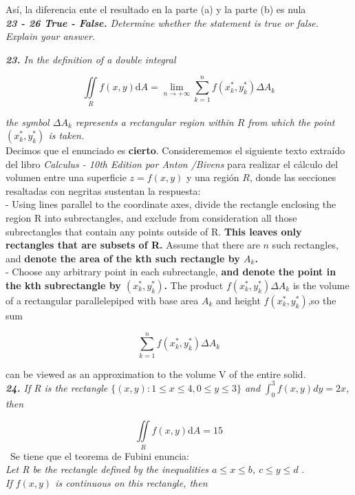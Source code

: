 \documentclass[a4paper,12pt]{article}
\begin{document}
		Así, la diferencia ente el resultado en la parte (a) y la parte (b) es nula\\

	\textit{\textbf{23 - 26 True - False.} Determine whether the statement is
	true or false. Explain your answer.\\}

	\textit{\textbf{23.} In the definition of a double integral}

		$$  \iint\limits_{R} f(x,y)\mathrm{d}A = \lim\limits_{n \rightarrow + \infty}
		 	\sum_{k=1}^{n} f(x^{*}_{k}, y^{*}_{k}) \Delta A_{k} $$

	\textit{ the symbol $ \Delta A_{k}$ represents a rectangular region within $R$
	 		from which the point $ (x^{*}_{k}, y^{*}_{k}) $ is taken.}\\

	Decimos que el enunciado es \textbf{cierto}. Considerememos el siguiente texto extraído
	del libro \textit{Calculus - 10th Edition por Anton /Bivens} para realizar el
	cálculo del volumen entre una superficie $ z = f(x,y)$ y una región $R$, donde
	las secciones resaltadas con negritas sustentan la respuesta: \\

	- Using lines parallel to the coordinate axes, divide the rectangle
	enclosing the region R into subrectangles, and exclude from consideration
	all those subrectangles that contain any points outside of R.
	\textbf{This leaves only rectangles that are subsets of R.} Assume that there are $n$
	such rectangles, and \textbf{denote the area of the kth such rectangle by $A_k$.} \\

	- Choose any arbitrary point in each subrectangle, \textbf{and denote the point in
	the kth subrectangle by $ (x^{*}_{k}, y^{*}_{k}) $.} The product
	$ f(x^{*}_{k}, y^{*}_{k}) \Delta A_k$  is the volume of a rectangular
	parallelepiped with base area $A_k$ and height $f(x^{*}_{k}, y^{*}_{k})$,so the sum

		$$ \sum_{k=1}^{n} f(x^{*}_{k}, y^{*}_{k}) \Delta A_{k} $$

	can be viewed as an approximation to the volume V of the entire solid.\\

	\textit{\textbf{24.} If R is the rectangle $ \{(x,y):1 \leq x \leq 4,0 \leq y \leq 3\} $
			and $\int_{0}^{3} f(x,y) dy = 2x$, then}

		$$ \iint\limits_{R} f(x,y)\mathrm{d}A = 15 $$
	\
	Se tiene que el teorema de Fubini enuncia:\\
	\textit{ Let R be the rectangle defined by the inequalities $a \leq x \leq b$, $c \leq y \leq d$ }.\\
	\textit{ If $f(x, y)$ is continuous on this rectangle, then }
\end{document}
